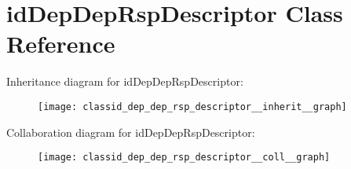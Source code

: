 \hypertarget{classid_dep_dep_rsp_descriptor}{}\section{id\+Dep\+Dep\+Rsp\+Descriptor Class Reference}
\label{classid_dep_dep_rsp_descriptor}


Inheritance diagram for id\+Dep\+Dep\+Rsp\+Descriptor\+:
\nopagebreak
\begin{figure}[H]
\begin{center}
\leavevmode
\texttt{[image: classid\_dep\_dep\_rsp\_descriptor\_\_inherit\_\_graph]}
\end{center}
\end{figure}


Collaboration diagram for id\+Dep\+Dep\+Rsp\+Descriptor\+:
\nopagebreak
\begin{figure}[H]
\begin{center}
\leavevmode
\texttt{[image: classid\_dep\_dep\_rsp\_descriptor\_\_coll\_\_graph]}
\end{center}
\end{figure}
